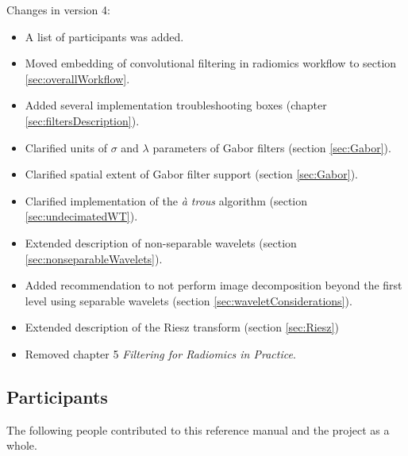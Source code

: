 \documentclass[fleqn,a4paper,oneside,openany]{book}
\renewcommand{\marginnote}[2][]{}
\begin{document}
\noindent Changes in version 4:
\begin{itemize}
    \item A list of participants was added.
    \item Moved embedding of convolutional filtering in radiomics workflow to section \ref{sec:overallWorkflow}.
    \item Added several implementation troubleshooting boxes (chapter \ref{sec:filtersDescription}).
    \item Clarified units of $\sigma$ and $\lambda$ parameters of Gabor filters (section \ref{sec:Gabor}).
    \item Clarified spatial extent of Gabor filter support (section \ref{sec:Gabor}).
    \item Clarified implementation of the \emph{\`{a} trous} algorithm (section \ref{sec:undecimatedWT}).
    \item Extended description of non-separable wavelets (section \ref{sec:nonseparableWavelets}).
    \item Added recommendation to not perform image decomposition beyond the first level using separable wavelets (section \ref{sec:waveletConsiderations}).
    \item Extended description of the Riesz transform (section \ref{sec:Riesz})
    \item Removed chapter 5 \emph{Filtering for Radiomics in Practice}.
\end{itemize}

\subsection*{Participants}
\marginnote{\footnotesize v4: Added list of participants. v5: updated list. v6: updated list. v8: updated list to reflect manuscript}
The following people contributed to this reference manual and the project as a whole.
\end{document}
